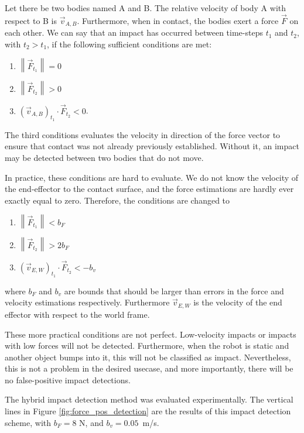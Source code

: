 \documentclass[11pt]{report}
\numberwithin{equation}{section}        %
\numberwithin{figure}{section}          %
\numberwithin{table}{section}           %
\begin{document}
  Let there be two bodies named A and B. The relative velocity of body A with respect to B is $\vec{v}_{A,B}$. Furthermore, when in contact, the bodies exert a force $\vec{F}$ on each other. We can say that an impact has occurred between time-steps $t_1$ and $t_2$, with $t_2>t_1$, if the following sufficient conditions are met:
\begin{enumerate}
  \item $\left \| \vec{F}_{t_1} \right \|= 0$
  \item $\left \| \vec{F}_{t_2} \right \|> 0$
  \item $(\vec{v}_{A,B})_{t_1} \cdot \vec{F}_{t_2} < 0$.  
\end{enumerate}
  
  The third conditions evaluates the velocity in direction of the force vector to ensure that contact was not already previously established. Without it, an impact may be detected between two bodies that do not move.

  In practice, these conditions are hard to evaluate. We do not know the velocity of the end-effector to the contact surface, and the force estimations are hardly ever exactly equal to zero. Therefore, the conditions are changed to

  \begin{enumerate}
  \item $\left \| \vec{F}_{t_1} \right \|< b_F$
  \item $\left \| \vec{F}_{t_2} \right \|> 2b_F$
  \item $(\vec{v}_{E,W})_{t_1} \cdot \vec{F}_{t_2} < -b_v$  
\end{enumerate}
  where $b_F$ and $b_v$ are bounds that should be larger than errors in the force and velocity estimations respectively. Furthermore $\vec{v}_{E,W}$ is the velocity of the end effector with respect to the world frame.

  These more practical conditions are not perfect. Low-velocity impacts or impacts with low forces will not be detected. Furthermore, when the robot is static and another object bumps into it, this will not be classified as impact. Nevertheless, this is not a problem in the desired usecase, and more importantly, there will be no false-positive impact detections. 

  The hybrid impact detection method was evaluated experimentally. The vertical lines in Figure \ref{fig:force_pos_detection} are the results of this impact detection scheme, with $b_F = 8$ N, and $b_v = 0.05$~m/s. 
\end{document}
